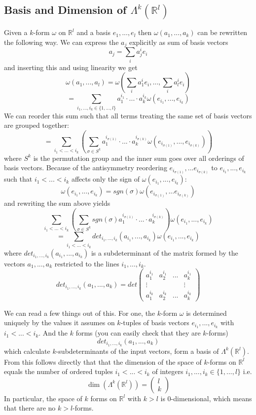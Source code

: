 \subsection{Basis and Dimension of $\Lambda^k(\mathbb R^l)$}
Given a $k$-form $\omega$ on $\mathbb R^l$ and a basis $e_1,...,e_l$ then $\omega(a_1,...,a_k)$ can be rewritten the following way. We can express the $a_j$ explicitly as sum of basis vectors
\[a_j = \sum_{i}a_j^ie_i\]
and inserting this and using linearity we get
\[\omega(a_1,...,a_l) = \omega(\sum_{i}a_1^ie_i,...,\sum_{i}a_l^ie_i)\]
\[= \sum_{i_1,...,i_k \in\{1,...,l\}}a_1^{i_1}\cdot ... \cdot a_k^{i_k} \omega(e_{i_1},...,e_{i_k})\]
We can reorder this sum such that all terms treating the same set of basis vectors are grouped together:
\[=\sum_{i_1<...<i_k}\left(\sum_{\sigma \in S^k} a_1^{i_{\sigma(1)}}\cdot ... \cdot a_k^{i_{\sigma(k)}} \omega(e_{i_{\sigma(1)}},...,e_{i_{\sigma(k)}})\right)\]
where $S^k$ is the permutation group and the inner sum goes over all orderings of basis vectors.
Because of the antisymmetry reordering $e_{i_{\sigma(1)}},...e_{i_{\sigma(k)}}$ to $e_{i_1},...,e_{i_k}$ such that $i_1<...<i_k$ affects only the sign of $\omega(e_{i_1},...,e_{i_k})$:
\[\omega(e_{i_1},...,e_{i_k}) = sgn(\sigma)\omega(e_{i_{\sigma(1)}},...e_{i_{\sigma(k)}})\]
and rewriting the sum above yields
\[\sum_{i_1<...<i_k}\left(\sum_{\sigma \in S^k} sgn(\sigma) a_1^{i_{\sigma(1)}}\cdot ... \cdot a_k^{i_{\sigma(k)}}\right) \omega(e_{i_1},...,e_{i_k})\]
\[ = \sum_{i_1<...<i_k} det_{i_1,...,i_k}(a_{i_1},...,a_{i_{k}}) \omega(e_{i_1},...,e_{i_k})\]
where $det_{i_1,...,i_k}(a_{i_1},...,a_{i_{k}})$ is a subdeterminant of the matrix formed by the vectors $a_1,...,a_k$ restricted to the lines $i_1,...,i_k$.
\[det_{i_1,...,i_k}(a_1,...,a_k) = det \begin{pmatrix}
a_1^{i_1} &a_2^{i_1} &...&a_k^{i_1} \\
\vdots & & & \vdots \\
a_1^{i_k} &a_2^{i_k} &...&a_k^{i_k} 
\end{pmatrix}\]

We can read a few things out of this. For one, the $k$-form $\omega$ is determined uniquely by the values it assumes on $k$-tuples of basis vectors $e_{i_1},...,e_{i_k}$ with $i_1 <...< i_k$. And the $k$ forms (you can easily check that they are $k$-forms)
\[det_{i_1,...,i_k}(a_{1},...,a_{k})\]
which calculate $k$-subdeterminants of the input vectors, form a basis of $\Lambda^k(\mathbb R^l)$. From this follows directly that that the dimension of the  space of $k$-forms on $\mathbb R^l$ equals the number of ordered tuples $i_1<...<i_k$ of integers $i_1,...,i_k \in \{1,...,l\} $ i.e.
\[\dim (\Lambda^k(\mathbb R^l)) = \begin{pmatrix}
l \\
k
\end{pmatrix}\] 
In particular, the space of $k$ forms on $\mathbb R^l$ with $k>l$ is 0-dimensional, which means that there are no $k>l$-forms.

